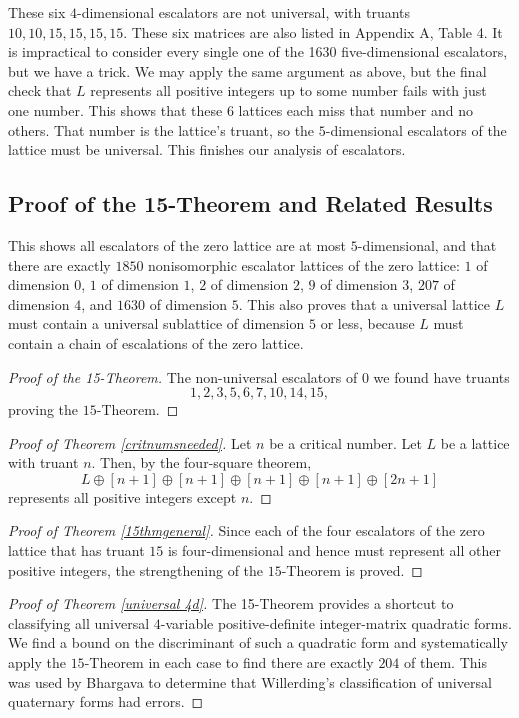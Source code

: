 \documentclass[letterpaper, 12pt]{article}
\begin{document}
These six $4$-dimensional escalators are not universal, with truants $10,10,15,15,15,15$. These six matrices are also listed in Appendix A, Table 4. It is impractical to consider every single one of the 1630 five-dimensional escalators, but we have a trick. We may apply the same argument as above, but the final check that $L$ represents all positive integers up to some number fails with just one number. This shows that these $6$ lattices each miss that number and no others. That number is the lattice's truant, so the $5$-dimensional escalators of the lattice must be universal. This finishes our analysis of escalators.

\subsection{Proof of the 15-Theorem and Related Results}
This shows all escalators of the zero lattice are at most $5$-dimensional, and that there are exactly $1850$ nonisomorphic escalator lattices of the zero lattice: $1$ of dimension $0$, $1$ of dimension $1$, $2$ of dimension $2$, $9$ of dimension $3$, $207$ of dimension $4$, and $1630$ of dimension $5$. This also proves that a universal lattice $L$ must contain a universal sublattice of dimension $5$ or less, because $L$ must contain a chain of escalations of the zero lattice.

\begin{proof}[Proof of the 15-Theorem]
    The non-universal escalators of $0$ we found have truants \[1, 2, 3, 5, 6, 7, 10, 14, 15,\] proving the $15$-Theorem.
\end{proof}
\begin{proof}[Proof of Theorem \ref{critnumsneeded}]
    Let $n$ be a critical number. Let $L$ be a lattice with truant $n$. Then, by the four-square theorem,
    \[L \oplus [n + 1] \oplus [n + 1] \oplus [n + 1] \oplus [n + 1] \oplus [2n + 1]\]
    represents all positive integers except $n$.
\end{proof}
\begin{proof}[Proof of Theorem \ref{15thmgeneral}]
    Since each of the four escalators of the zero lattice that has truant $15$ is four-dimensional and hence must represent all other positive integers, the strengthening of the $15$-Theorem is proved.
\end{proof}

\begin{proof}[Proof of Theorem \ref{universal 4d}]
The 15-Theorem provides a shortcut to classifying all universal $4$-variable positive-definite integer-matrix quadratic forms. We find a bound on the discriminant of such a quadratic form and systematically apply the $15$-Theorem in each case to find there are exactly $204$ of them. This was used by Bhargava to determine that Willerding's classification of universal quaternary forms had errors.
\end{proof}
\end{document}
